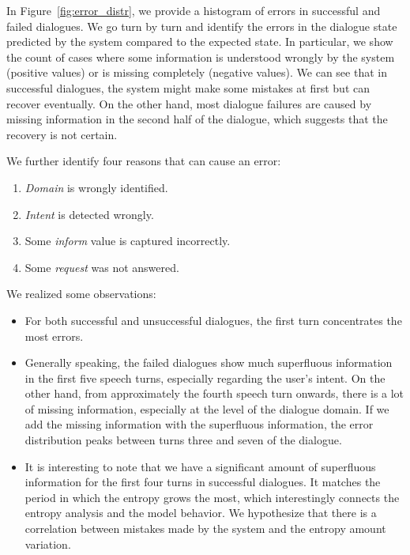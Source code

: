 In Figure~\ref{fig:error_distr}, we provide a histogram of errors in successful and failed dialogues.
We go turn by turn and identify the errors in the dialogue state predicted by the system compared to the expected state.
In particular, we show the count of cases where some information is understood wrongly by the system (positive values) or is missing completely (negative values).
We can see that in successful dialogues, the system might make some mistakes at first but can recover eventually.
On the other hand, most dialogue failures are caused by missing information in the second half of the dialogue, which suggests that the recovery is not certain.

We further identify four reasons that can cause an error:
\begin{enumerate}
    \item \emph{Domain} is wrongly identified.
    \item \emph{Intent} is detected wrongly.
    \item Some \emph{inform} value is captured incorrectly.
    \item Some \emph{request} was not answered.
\end{enumerate}
We realized some observations:
\begin{itemize}
    \item For both successful and unsuccessful dialogues, the first turn concentrates the most errors.
    
    \item Generally speaking, the failed dialogues show much superfluous information in the first five speech turns, especially regarding the user's intent. On the other hand, from approximately the fourth speech turn onwards, there is a lot of missing information, especially at the level of the dialogue domain. If we add the missing information with the superfluous information, the error distribution peaks between turns three and seven of the dialogue. 
    
    \item It is interesting to note that we have a significant amount of superfluous information for the first four turns in successful dialogues.
    It matches the period in which the entropy grows the most, which interestingly connects the entropy analysis and the model behavior. We hypothesize that there is a correlation between mistakes made by the system and the entropy amount variation.
\end{itemize}

